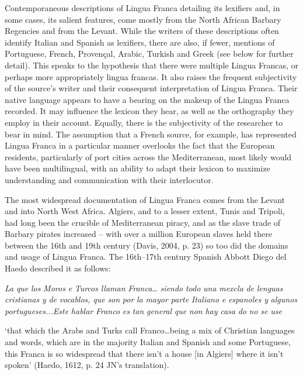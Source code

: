 \documentclass[output=paper]{langsci/langscibook}
\begin{document}
Contemporaneous descriptions of Lingua Franca detailing its lexifiers and, in some cases, its salient features, come mostly from the North African Barbary Regencies and from the Levant. While the writers of these descriptions often identify Italian and Spanish as lexifiers, there are also, if fewer, mentions of Portuguese, French, Provençal, Arabic, Turkish and Greek (see below for further detail). This speaks to the hypothesis that there were multiple Lingua Francas, or perhaps more appropriately lingua francas. It also raises the frequent subjectivity of the source’s writer and their consequent interpretation of Lingua Franca. Their native language appears to have a bearing on the makeup of the Lingua Franca recorded. It may influence the lexicon they hear, as well as the orthography they employ in their account. Equally, there is the subjectivity of the researcher to bear in mind. The assumption that a French source, for example, has represented Lingua Franca in a particular manner overlooks the fact that the European residents, particularly of port cities across the Mediterranean, most likely would have been multilingual, with an ability to adapt their lexicon to maximize understanding and communication with their interlocutor. 

The most widespread documentation of Lingua Franca comes from the Levant and into North West Africa. Algiers, and to a lesser extent, Tunis and Tripoli, had long been the crucible of Mediterranean piracy, and as the slave trade of Barbary pirates increased – with over a million European slaves held there between the 16th and 19th century (Davis, 2004, p. 23) so too did the domains and usage of Lingua Franca. The 16th–17th century Spanish Abbott Diego del Haedo described it as follows: 

\textit{La} \textit{que} \textit{los} \textit{Moros} \textit{e} \textit{Turcos} \textit{llaman} \textit{Franca…} \textit{siendo} \textit{todo} \textit{una} \textit{mexcla} \textit{de} \textit{lenguas} \textit{cristianas} \textit{y} \textit{de} \textit{vocablos,} \textit{que} \textit{son} \textit{por} \textit{la} \textit{mayor} \textit{parte} \textit{Italiano} \textit{e} \textit{espanoles} \textit{y} \textit{algunos} \textit{portugueses...Este} \textit{hablar} \textit{Franco} \textit{es} \textit{tan} \textit{general} \textit{que} \textit{non} \textit{hay} \textit{casa} \textit{do} \textit{no} \textit{se} \textit{use}

‘that which the Arabs and Turks call Franco…being a mix of Christian languages and words, which are in the majority Italian and Spanish and some Portuguese, this Franca is so widespread that there isn’t a house [in Algiers] where it isn’t spoken’  (Haedo, 1612, p. 24 JN’s translation).
\end{document}
